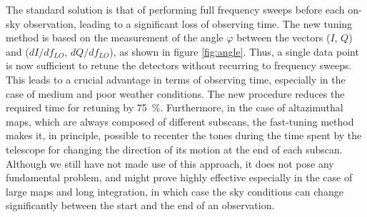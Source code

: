The standard solution is that of performing full frequency sweeps before each on-sky observation, leading to a significant loss of observing time. The new tuning method is based on the measurement of the angle $\varphi$ between the vectors ($I$, $Q$) and ($dI/df_{LO}$, $dQ/df_{LO}$), as shown in figure \ref{fig:angle}. Thus, a single data point is now sufficient to retune the detectors without recurring to frequency sweeps. This leads to a crucial advantage in terms of observing time, especially in the case of medium and poor weather conditions. The new procedure reduces the required time for retuning by 75~\%.
Furthermore, in the case of altazimuthal maps, which are always composed of different subscans, the fast-tuning method makes it, in principle, possible to recenter the tones during the time spent by the telescope for changing the direction of its motion at the end of each subscan. Although we still have not made use of this approach, it does not pose any fundamental problem, and might prove highly effective especially in the case of large maps and long integration, in which case the sky conditions can change significantly between the start and the end of an observation.


